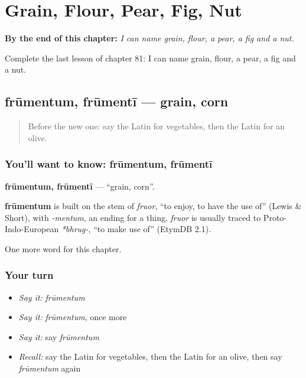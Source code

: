 
\chapter{Grain, Flour, Pear, Fig, Nut}
\label{ch:la-grain-flour-pear-fig-nut}

\begin{chapteropening}
\textbf{By the end of this chapter:} \emph{I can name grain, flour, a pear, a fig and a nut.}

Complete the last lesson of chapter 81: I can name grain, flour, a pear, a fig and a nut.
\end{chapteropening}

\section[frūmentum, frūmentī]{frūmentum, frūmentī — grain, corn}

\label{lesson:LA-C81-frumentum}



\begin{quote}
Before the new one: say the Latin for vegetables, then the Latin for an olive.
\end{quote}

\subsection*{You'll want to know: frūmentum, frūmentī}
\textbf{frūmentum, frūmentī} — \textquotedblleft{}grain, corn\textquotedblright{}.

\begin{cousinweb}
\textbf{frūmentum} is built on the stem of \emph{fruor}, \textquotedblleft{}to enjoy, to have the use of\textquotedblright{} (Lewis \& Short), with \emph{-mentum}, an ending for a thing. \emph{fruor} is usually traced to Proto-Indo-European \emph{*bhrug-}, \textquotedblleft{}to make use of\textquotedblright{} (EtymDB 2.1).
\end{cousinweb}

\begin{grammarlens}[title={What you've built}]
One more word for this chapter.
\end{grammarlens}

\subsection*{Your turn}
\begin{itemize}
\raggedright
  \item \emph{Say it:} \emph{frūmentum}
  \item \emph{Say it:} \emph{frūmentum}, once more
  \item \emph{Say it:} say \emph{frūmentum}
  \item \emph{Recall:} say the Latin for vegetables, then the Latin for an olive, then say \emph{frūmentum} again
\end{itemize}

